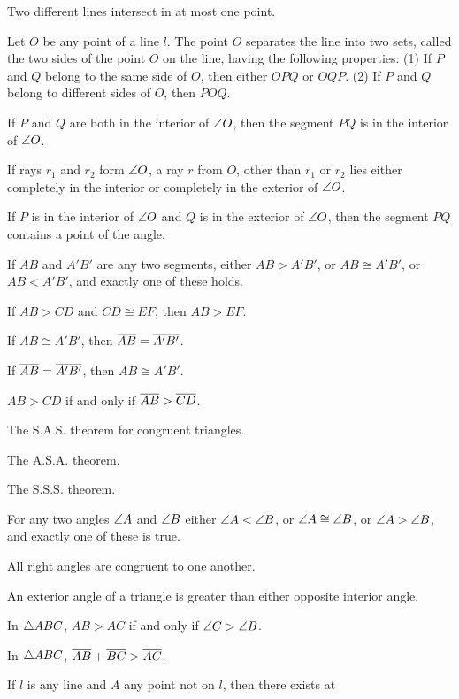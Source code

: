 \documentclass[11pt]{book}
\begin{document}
\begin{applist}
\item Two different lines intersect in at most one point.
\item Let $O$ be any point of a line $l$. The point $O$ separates the line
      into two sets, called the two sides of the point $O$ on the line,
      having the following properties: (1) If $P$ and $Q$ belong to the same
      side of $O$, then either $OPQ$ or $OQP$. (2) If $P$ and $Q$ belong to
      different sides of $O$, then $POQ$.
\item If $P$ and $Q$ are both in the interior of $\angle O$, then the segment
      $PQ$ is in the interior of $\angle O$.
\item If rays $r_1$ and $r_2$ form $\angle O$, a ray $r$ from $O$, other than
      $r_1$ or $r_2$ lies either completely in the interior or completely in
      the exterior of $\angle O$.
\item If $P$ is in the interior of $\angle O$ and $Q$ is in the exterior of
      $\angle O$, then the segment $PQ$ contains a point of the angle.
\item If $AB$ and $A'B'$ are any two segments, either $AB > A'B'$, or
      $AB \cong A'B'$, or $AB < A'B'$, and exactly one of these holds.
\item If $AB > CD$ and $CD \cong EF$, then $AB > EF$.
\item If $AB \cong A'B'$, then $\overline{AB} = \overline{A'B'}$.
\item If $\overline{AB} = \overline{A'B'}$, then $AB \cong A'B'$.
\item $AB > CD$ if and only if $\overline{AB} > \overline{CD}$.
\item The S.A.S. theorem for congruent triangles.
\item The A.S.A. theorem.
\item The S.S.S. theorem.
\item For any two angles $\angle A$ and $\angle B$ either
      $\angle A < \angle B$, or $\angle A \cong \angle B$, or
      $\angle A > \angle B$, and exactly one of these is true.
\item All right angles are congruent to one another.
\item An exterior angle of a triangle is greater than either opposite
      interior angle.
\item In $\triangle ABC$, $AB > AC$ if and only if $\angle C > \angle B$.
\item In $\triangle ABC$, $\overline{AB} + \overline{BC} > \overline{AC}$.
\item If $l$ is any line and $A$ any point not on $l$, then there exists at

\end{applist}
\end{document}
